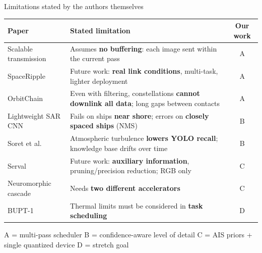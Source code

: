 \documentclass[aspectratio=169,10pt]{beamer}
\begin{document}
\begin{frame}{Limitations stated by the authors themselves}
\scriptsize
\renewcommand{\arraystretch}{1.12}
\begin{tabularx}{\textwidth}{@{}l L c@{}}
\toprule
\textbf{Paper} & \textbf{Stated limitation} & \textbf{Our work} \\
\midrule
Scalable transmission & Assumes \textbf{no buffering}: each image sent within the current pass & A \\
SpaceRipple & Future work: \textbf{real link conditions}, multi-task, lighter deployment & A \\
OrbitChain & Even with filtering, constellations \textbf{cannot downlink all data}; long gaps between contacts & A \\
Lightweight SAR CNN & Fails on ships \textbf{near shore}; errors on \textbf{closely spaced ships} (NMS) & B \\
Soret et al. & Atmospheric turbulence \textbf{lowers YOLO recall}; knowledge base drifts over time & B \\
Serval & Future work: \textbf{auxiliary information}, pruning/precision reduction; RGB only & C \\
Neuromorphic cascade & Needs \textbf{two different accelerators} & C \\
BUPT-1 & Thermal limits must be considered in \textbf{task scheduling} & D \\
\bottomrule
\end{tabularx}
\vspace{2mm}
\begin{center}\scriptsize\color{muted}
A = multi-pass scheduler \quad B = confidence-aware level of detail \quad C = AIS priors + single quantized device \quad D = stretch goal
\end{center}
\end{frame}
\end{document}

